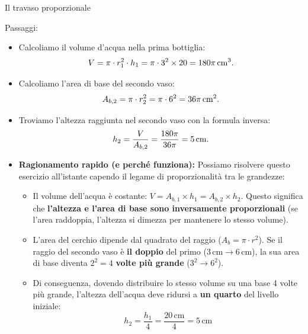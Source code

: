 \begin{esercizio}{Il travaso proporzionale}

\responsespace{5.5cm}

\begin{soluzione}
  Passaggi:
  \begin{itemize}
    \item Calcoliamo il volume d'acqua nella prima bottiglia:
    \[
    V = \pi \cdot r_1^2 \cdot h_1 = \pi \cdot 3^2 \times 20 = 180\pi\,\mathrm{cm^3}.
    \]
    \item Calcoliamo l'area di base del secondo vaso:
    \[
    A_{b,2} = \pi \cdot r_2^2 = \pi \cdot 6^2 = 36\pi\,\mathrm{cm^2}.
    \]
    \item Troviamo l'altezza raggiunta nel secondo vaso con la formula inversa:
    \[
    h_2 = \frac{V}{A_{b,2}} = \frac{180\pi}{36\pi} = 5\,\mathrm{cm}.
    \]
    \item \textbf{Ragionamento rapido (e perché funziona):} 
    Possiamo risolvere questo esercizio all'istante capendo il legame di proporzionalità tra le grandezze:
    \begin{itemize}
      \item Il volume dell'acqua è costante: $V = A_{b,1} \times h_1 = A_{b,2} \times h_2$. Questo significa che \textbf{l'altezza e l'area di base sono inversamente proporzionali} (se l'area raddoppia, l'altezza si dimezza per mantenere lo stesso volume).
      \item L'area del cerchio dipende dal quadrato del raggio ($A_b = \pi \cdot r^2$). Se il raggio del secondo vaso è \textbf{il doppio} del primo ($3\,\mathrm{cm} \to 6\,\mathrm{cm}$), la sua area di base diventa $2^2 = 4$ \textbf{volte più grande} ($3^2 \to 6^2$).
      \item Di conseguenza, dovendo distribuire lo stesso volume su una base 4 volte più grande, l'altezza dell'acqua deve ridursi a \textbf{un quarto} del livello iniziale:
      \[
      h_2 = \frac{h_1}{4} = \frac{20\,\mathrm{cm}}{4} = 5\,\mathrm{cm}
      \]
    \end{itemize}
  \end{itemize}
\end{soluzione}
\end{esercizio}

\condnewpage

